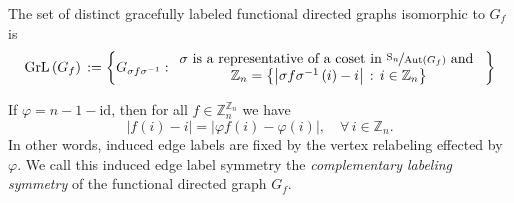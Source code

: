 \begin{definition}\label{defn:graceful-functional-graphs-set}
The set of distinct gracefully labeled functional directed graphs isomorphic to $G_{f}$ is 
\[
\text{GrL}\left(G_{f}\right)\,:=\left\{ G_{\sigma f\sigma^{-1}}:\begin{array}{c}
\sigma\text{ is a representative of a coset in }\nicefrac{\text{S}_{n}}{\text{Aut}\left(G_{f}\right)}\text{ and }\\
\mathbb{Z}_{n}=\left\{ \left|\sigma f\sigma^{-1}\left(i\right)-i\right|\,:\,i\in\mathbb{Z}_{n}\right\} 
\end{array}\right\} 
\]
\end{definition}
\begin{definition}\label{defn:complementary-labeling-symmetry}
If $\varphi=n-1-\text{id}$, then for all $f\in\mathbb{Z}_{n}^{\mathbb{Z}_{n}}$ we have
\begin{equation}
\left|f(i)-i\right|=\left|\varphi f(i)-\varphi(i)\right|,\quad\forall\,i\in\mathbb{Z}_{n}.
\end{equation}
In other words, induced edge labels are fixed by the vertex relabeling effected by $\varphi$. We call this induced edge label symmetry the \emph{complementary labeling symmetry} of the functional directed graph $G_f$.
\end{definition}

